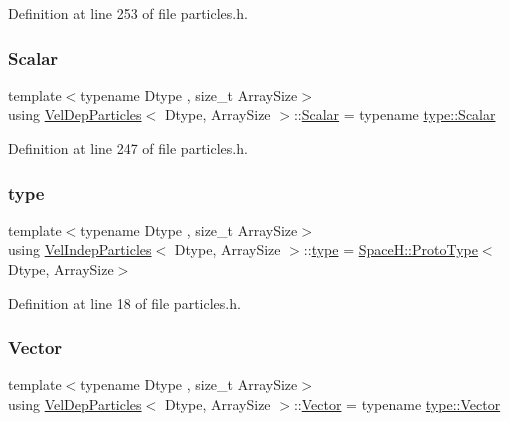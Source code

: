 Definition at line 253 of file particles.\+h.

\mbox{\label{class_vel_dep_particles_a6b347abd885de56bb37aa1222a99f76e}} 
\subsubsection{\texorpdfstring{Scalar}{Scalar}}
{\footnotesize\ttfamily template$<$typename Dtype , size\+\_\+t Array\+Size$>$ \\
using \mbox{\hyperlink{class_vel_dep_particles}{Vel\+Dep\+Particles}}$<$ Dtype, Array\+Size $>$\+::\mbox{\hyperlink{class_vel_indep_particles_a5d275b22f0d759f360ddd80e78f4b466}{Scalar}} =  typename \mbox{\hyperlink{struct_space_h_1_1_proto_type_af3c8245d83d9db64749882920de5c274}{type\+::\+Scalar}}}



Definition at line 247 of file particles.\+h.

\mbox{\label{class_vel_dep_particles_a0c62b43c2f0a50565e5e06587fddee18}} 
\subsubsection{\texorpdfstring{type}{type}}
{\footnotesize\ttfamily template$<$typename Dtype , size\+\_\+t Array\+Size$>$ \\
using \mbox{\hyperlink{class_vel_indep_particles}{Vel\+Indep\+Particles}}$<$ Dtype, Array\+Size $>$\+::\mbox{\hyperlink{class_vel_indep_particles_a0c62b43c2f0a50565e5e06587fddee18}{type}} =  \mbox{\hyperlink{struct_space_h_1_1_proto_type}{Space\+H\+::\+Proto\+Type}}$<$Dtype, Array\+Size$>$}



Definition at line 18 of file particles.\+h.

\mbox{\label{class_vel_dep_particles_ac1fe6e4959173444add754794a0ba2fc}} 
\subsubsection{\texorpdfstring{Vector}{Vector}}
{\footnotesize\ttfamily template$<$typename Dtype , size\+\_\+t Array\+Size$>$ \\
using \mbox{\hyperlink{class_vel_dep_particles}{Vel\+Dep\+Particles}}$<$ Dtype, Array\+Size $>$\+::\mbox{\hyperlink{class_vel_indep_particles_aa7e03da81f44941c06abf43ec2180079}{Vector}} =  typename \mbox{\hyperlink{struct_space_h_1_1_proto_type_a316b81f4660b2b4fab14a8e1f23b6089}{type\+::\+Vector}}}



